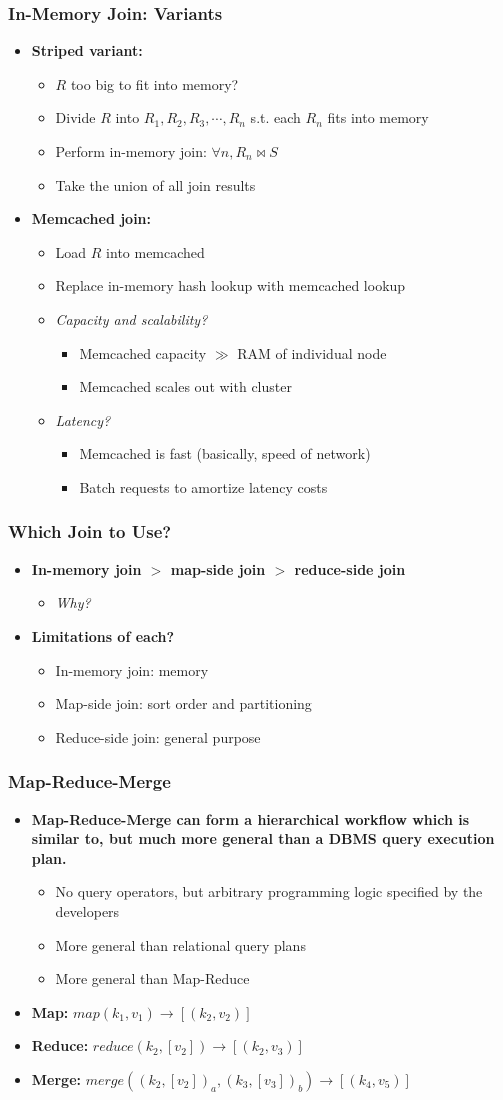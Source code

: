 \documentclass{beamer}
\newcommand{\bi}{\begin{itemize}}
\newcommand{\ei}{\end{itemize}}
\newcommand{\ii}{\item}
\newcommand*{\myblue}[1]{\textcolor{myblue}{#1}}
\newcommand*{\myred}[1]{\textcolor{myred}{#1}}
\newcommand{\join}{\Join}
\begin{document}


\begin{frame}
\frametitle{In-Memory Join: Variants}

\bi
\ii \textbf{Striped variant:}
\bi
\ii $R$ too big to fit into memory? 
\ii Divide $R$ into $R_1, R_2, R_3, \cdots , R_n$ s.t. each $R_n$ fits into memory
\ii Perform in-memory join: $\forall n, R_n \join S$
\ii Take the union of all join results
\ei
\ei

\bi
\ii \textbf{Memcached join:}
\bi
\ii Load $R$ into memcached
\ii Replace in-memory hash lookup with memcached lookup
\ii \myblue{\textit{Capacity and scalability?}}
\bi
\ii Memcached capacity $\gg$ RAM of individual node
\ii Memcached scales out with cluster
\ei
\ii \myblue{\textit{Latency?}}
\bi
\ii Memcached is fast (basically, speed of network)
\ii Batch requests to amortize latency costs
\ei
\ei
\ei

\end{frame}



\begin{frame}
\frametitle{Which Join to Use?}

\bi
\ii \textbf{In-memory join $>$ map-side join $>$ reduce-side join}
\bi
\ii \myred{\textit{Why?}}
\ei
\ei

\bi
\ii \textbf{Limitations of each?}
\bi
\ii In-memory join: memory
\ii Map-side join: sort order and partitioning
\ii Reduce-side join: general purpose
\ei
\ei

\end{frame}




\begin{frame}
\frametitle{Map-Reduce-Merge}

\bi
\ii \textbf{Map-Reduce-Merge can form a hierarchical workflow which is similar to, but much more general than a DBMS query execution plan.}
\bi
\ii No query operators, but arbitrary programming logic specified by the developers
\ii More general than relational query plans
\ii More general than Map-Reduce
\ei
\ei

\bi
\ii \textbf{Map:} $map(k_1, v_1) \rightarrow [(k_2, v_2)]$
\ii \textbf{Reduce:} $reduce(k_2, [v_2]) \rightarrow [(k_2, v_3)]$
\ii \textbf{Merge:} $merge((k_2, [v_2])_a, (k_3, [v_3])_b) \rightarrow [(k_4, v_5)]$
\ei
\end{frame}
\end{document}
